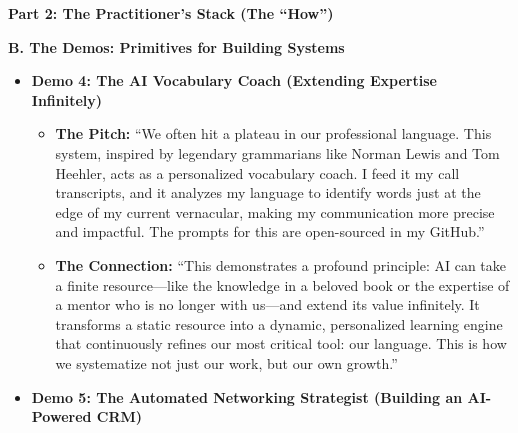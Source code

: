 \documentclass[
  ignorenonframetext,
  aspectratio=169,
]{beamer}
\providecommand{\tightlist}{%
  \setlength{\itemsep}{0pt}\setlength{\parskip}{0pt}}
\begin{document}
\begin{frame}{\textbf{Part 2: The Practitioner's Stack (The ``How'')}}
\begin{block}{\textbf{B. The Demos: Primitives for Building Systems}}
\begin{itemize}
  \begin{itemize}
  \tightlist
  \item
    \textbf{The Pitch:} ``As engineers, we're great at getting feedback
    on our code, but often terrible at getting objective feedback on our
    communication. I treat this as another engineering problem. By
    recording and transcribing my professional calls (with consent), I
    create a dataset of my own performance. I then use AI to analyze it,
    asking critical questions: `Where are my communication gaps?', `How
    could I have handled this negotiation better?', `What is the
    sentiment of this call?' This has been one of the most high-leverage
    ways to improve myself. I will often ask AI for book
    recommendations---whether it is a new domain I'm getting into (like
    a certain sector of private equity), a specific communication skill
    that I'm interested in developing, or an interpersonal skill.''\\
  \item
    \textbf{The Connection:} ``This system provides a data-driven,
    objective feedback loop for the soft skills that determine career
    velocity. It helped me identify a tendency to be overly
    accommodative in negotiations and gave me the confidence to advocate
    for myself more effectively. It's a way to systematically debug our
    own professional performance, addressing the imposter syndrome that
    holds so many of us back.''\\
  \end{itemize}
\item
  \textbf{Demo 4: The AI Vocabulary Coach (Extending Expertise
  Infinitely)}

  \begin{itemize}
  \tightlist
  \item
    \textbf{The Pitch:} ``We often hit a plateau in our professional
    language. This system, inspired by legendary grammarians like Norman
    Lewis and Tom Heehler, acts as a personalized vocabulary coach. I
    feed it my call transcripts, and it analyzes my language to identify
    words just at the edge of my current vernacular, making my
    communication more precise and impactful. The prompts for this are
    open-sourced in my GitHub.''\\
  \item
    \textbf{The Connection:} ``This demonstrates a profound principle:
    AI can take a finite resource---like the knowledge in a beloved book
    or the expertise of a mentor who is no longer with us---and extend
    its value infinitely. It transforms a static resource into a
    dynamic, personalized learning engine that continuously refines our
    most critical tool: our language. This is how we systematize not
    just our work, but our own growth.''\\
  \end{itemize}
\item
  \textbf{Demo 5: The Automated Networking Strategist (Building an
  AI-Powered CRM)}


\end{itemize}
\end{block}
\end{frame}
\end{document}
